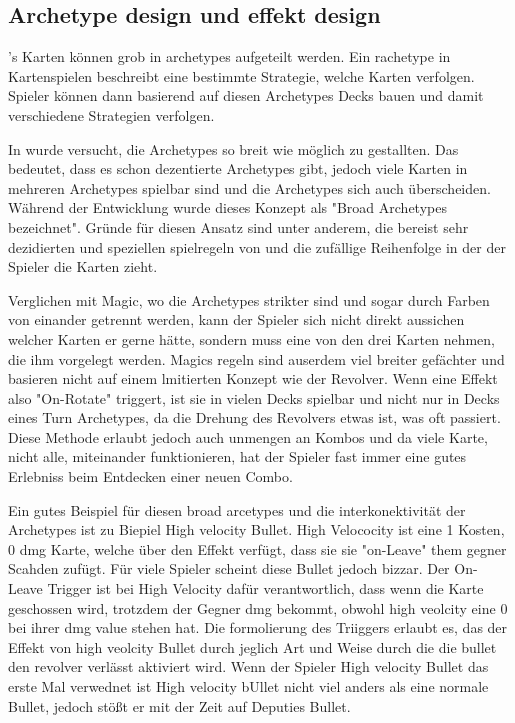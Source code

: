 \subsection{Archetype design und effekt design}\label{subsec:placementMatters}

\FF's Karten können grob in archetypes aufgeteilt werden. Ein rachetype in Kartenspielen beschreibt eine bestimmte Strategie, welche Karten verfolgen.
Spieler können dann basierend auf diesen Archetypes Decks bauen und damit verschiedene Strategien verfolgen.\cite{whatIsAnArchetype}


In \FF wurde versucht, die Archetypes so breit wie möglich zu gestallten. Das bedeutet, dass es schon dezentierte Archetypes
gibt, jedoch viele Karten in mehreren Archetypes spielbar sind und die Archetypes sich auch überscheiden.
Während der Entwicklung wurde dieses Konzept als "Broad Archetypes bezeichnet". Gründe für diesen Ansatz sind unter anderem,
die bereist sehr dezidierten und speziellen spielregeln von \FF  und die zufällige Reihenfolge in der der Spieler die Karten zieht.


Verglichen mit Magic, wo die Archetypes strikter sind und sogar durch Farben von einander getrennt werden, kann der
Spieler sich nicht direkt aussichen welcher Karten er gerne hätte, sondern muss eine von den drei Karten nehmen, die ihm vorgelegt werden.
Magics regeln sind auserdem viel breiter gefächter und basieren nicht auf einem lmitierten Konzept wie der Revolver.
Wenn eine Effekt also "On-Rotate" triggert, ist sie in vielen Decks spielbar und nicht nur in Decks eines Turn Archetypes,
da die Drehung des Revolvers etwas ist, was oft passiert. Diese Methode erlaubt jedoch auch unmengen an Kombos und da
viele Karte, nicht alle, miteinander funktionieren, hat der Spieler fast immer eine gutes Erlebniss beim Entdecken einer neuen Combo.


Ein gutes Beispiel für diesen broad arcetypes und die interkonektivität der Archetypes ist zu Biepiel High velocity Bullet.
High Velococity ist eine 1 Kosten, 0 dmg Karte, welche über den Effekt verfügt, dass sie sie "on-Leave" them gegner Scahden zufügt.
Für viele Spieler scheint diese Bullet jedoch bizzar. Der On-Leave Trigger ist bei High Velocity dafür verantwortlich,
dass wenn die Karte geschossen wird, trotzdem der Gegner dmg bekommt, obwohl high veolcity eine 0 bei ihrer dmg value stehen hat.
Die formolierung des Triiggers erlaubt es, das der Effekt von high veolcity Bullet durch jeglich Art und Weise durch die die bullet den revolver verlässt aktiviert wird.
Wenn der Spieler High velocity Bullet das erste Mal verwednet ist High velocity bUllet nicht viel anders als eine normale Bullet,
jedoch stößt er mit der Zeit auf Deputies Bullet.


